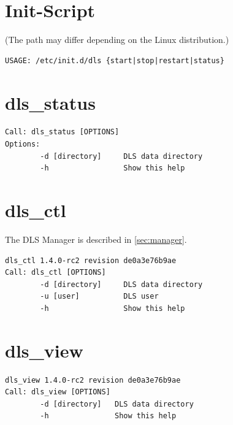 \documentclass[a4paper,12pt,BCOR6mm,bibtotoc,idxtotoc]{scrbook}
\begin{document}
\section{Init-Script}

(The path may differ depending on the Linux distribution.)

\begin{lstlisting}
USAGE: /etc/init.d/dls {start|stop|restart|status}
\end{lstlisting}


\section{dls\_status}

\begin{lstlisting}
Call: dls_status [OPTIONS]
Options:
        -d [directory]     DLS data directory
        -h                 Show this help
\end{lstlisting}


\section{dls\_ctl}
\label{sec:apx_cmd_dlsctl}

The DLS Manager is described in \autoref{sec:manager}.

\begin{lstlisting}
dls_ctl 1.4.0-rc2 revision de0a3e76b9ae
Call: dls_ctl [OPTIONS]
        -d [directory]     DLS data directory
        -u [user]          DLS user
        -h                 Show this help
\end{lstlisting}


\section{dls\_view}

\begin{lstlisting}
dls_view 1.4.0-rc2 revision de0a3e76b9ae
Call: dls_view [OPTIONS]
        -d [directory]   DLS data directory
        -h               Show this help
\end{lstlisting}
\end{document}
